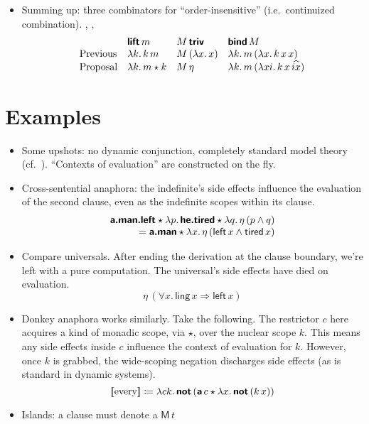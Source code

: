 \begin{itemize}
	\item Summing up: three combinators for ``order-insensitive'' (i.e.~continuized combination). , , %
	\[\begin{array}{lllll}
		& \bsf{lift}\,m & M\,\bsf{triv} & \bsf{bind}\,M %
		\\
		\text{Previous} & \lambda k.\,k\,m & M\,(\lambda x.\,x) & \lambda k.\,m\,(\lambda x.\,k\,x\,x)%
		\\
		\text{Proposal} & \lambda k.\,m \star k & M\,\eta & \lambda k.\,m\,(\lambda xi.\,k\,x\,\widehat{ix})%
	\end{array}\]
\end{itemize}

\section{Examples}
\begin{itemize}
	\item Some upshots: no dynamic conjunction, completely standard model theory (cf.~\citealt{Groote:2006}). ``Contexts of evaluation'' are constructed on the fly. %
	
	\item Cross-sentential anaphora: the indefinite's side effects influence the evaluation of the second clause, even as the indefinite scopes within its clause. %
	\[\begin{array}{r}
		\bsf{a.man.left} \star \lambda p.\,\bsf{he.tired} \star \lambda q.\,\eta\,(p \wedge q)%
		\\
		= \bsf{a.man} \star \lambda x.\,\eta\,(\textsf{left}\,x \wedge \textsf{tired}\,x)%
	\end{array}\]
	
	\item Compare universals. After ending the derivation at the clause boundary, we're left with a pure computation. The universal's side effects have died on evaluation.%
	\[\eta\,(\forall x.\,\textsf{ling}\,x \Rightarrow \textsf{left}\,x)\]
	
	\item Donkey anaphora works similarly. Take the following. The restrictor $c$ here acquires a kind of monadic scope, via $\star$, over the nuclear scope $k$. This means any side effects inside $c$ influence the context of evaluation for $k$. However, once $k$ is grabbed, the wide-scoping negation discharges side effects (as is standard in dynamic systems). %
	\[\left [\!\left [ \text{every} \right ]\!\right ] \coloneqq \lambda ck.\,\textbf{\textsf{not}}\,(\textbf{\textsf{a}}\,c \star \lambda x.\,\textbf{\textsf{not}}\,(k\,x))\]%
	
	\item Islands: a clause must denote a $\textsf{M}\,t$
\end{itemize}

\citealt{Groote:2001}
\citealt{Charlow:diss}
\citealt{Bumford:inc}

{\small}
